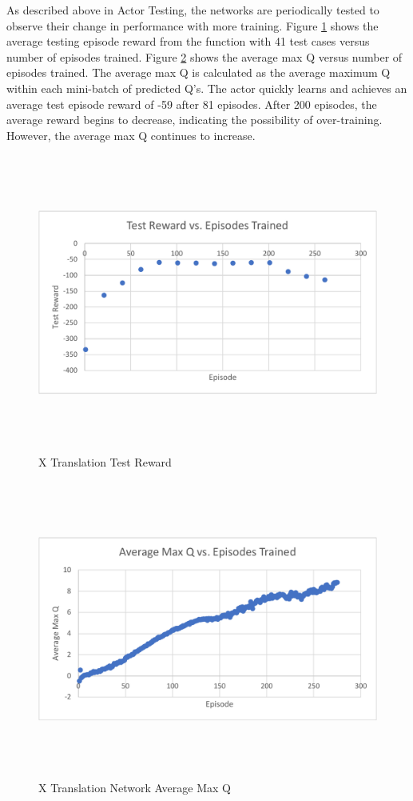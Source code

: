 As described above in Actor Testing, the networks are periodically tested to observe their change in performance with more training. Figure \ref{fig:x_r} shows the average testing episode reward from the  function with 41 test cases versus number of episodes trained. Figure \ref{fig:x_q} shows the average max Q versus number of episodes trained. The average max Q is calculated as the average maximum Q within each mini-batch of predicted Q's. The actor quickly learns and achieves an average test episode reward of -59 after 81 episodes. After 200 episodes, the average reward begins to decrease, indicating the possibility of over-training. However, the average max Q continues to increase.
\begin{figure}[H]
	\centering
	\includegraphics[width=6in, height=3.85in, keepaspectratio]{figures/train_figs/x_r.pdf}
	\caption{X Translation Test Reward} \label{fig:x_r}
\end{figure}
\begin{figure}[H]
	\centering
	\includegraphics[width=6in, height=3.85in, keepaspectratio]{figures/train_figs/x_q.pdf}
	\caption{X Translation Network Average Max Q} \label{fig:x_q}
\end{figure}

